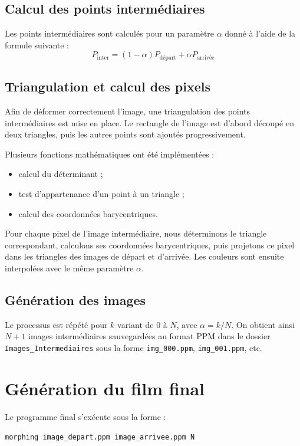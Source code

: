 \documentclass[11pt,a4paper]{article}
\begin{document}
	\subsection{Calcul des points intermédiaires}
	Les points intermédiaires sont calculés pour un paramètre $\alpha$ donné à l’aide de la formule suivante :
	\[
	P_{\text{inter}} = (1 - \alpha) P_{\text{départ}} + \alpha P_{\text{arrivée}}
	\]
	
	\subsection{Triangulation et calcul des pixels}
	Afin de déformer correctement l’image, une triangulation des points intermédiaires est mise en place. Le rectangle de l’image est d’abord découpé en deux triangles, puis les autres points sont ajoutés progressivement.
	
	Plusieurs fonctions mathématiques ont été implémentées :
	\begin{itemize}
		\item calcul du déterminant ;
		\item test d’appartenance d’un point à un triangle ;
		\item calcul des coordonnées barycentriques.
	\end{itemize}
	
	Pour chaque pixel de l’image intermédiaire, nous déterminons le triangle correspondant, calculons ses coordonnées barycentriques, puis projetons ce pixel dans les triangles des images de départ et d’arrivée. Les couleurs sont ensuite interpolées avec le même paramètre $\alpha$.
	
	\subsection{Génération des images}
	Le processus est répété pour $k$ variant de $0$ à $N$, avec $\alpha = k/N$.  
	On obtient ainsi $N+1$ images intermédiaires sauvegardées au format PPM dans le dossier \texttt{Images\_Intermediaires} sous la forme \texttt{img\_000.ppm}, \texttt{img\_001.ppm}, etc.
	
	\section{Génération du film final}
	
	Le programme final s’exécute sous la forme :
	\begin{center}
		\texttt{morphing image\_depart.ppm image\_arrivee.ppm N}
	\end{center}
	
\end{document}
